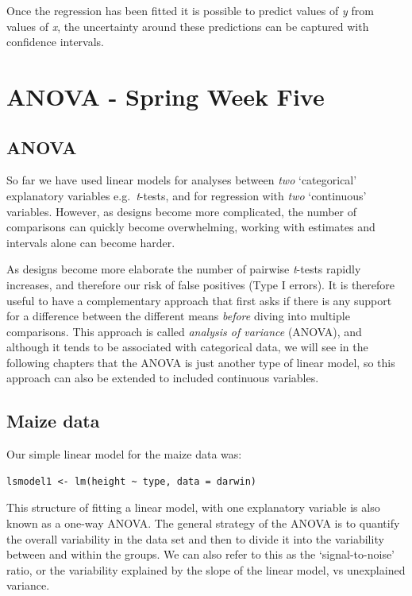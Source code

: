 \documentclass[
]{book}
\begin{document}
Once the regression has been fitted it is possible to predict values of \emph{y} from values of \emph{x}, the uncertainty around these predictions can be captured with confidence intervals.

\hypertarget{anova---spring-week-five}{%
\chapter{ANOVA - Spring Week Five}\label{anova---spring-week-five}}

\hypertarget{anova}{%
\section{ANOVA}\label{anova}}

So far we have used linear models for analyses between \emph{two} `categorical' explanatory variables e.g.~\emph{t}-tests, and for regression with \emph{two} `continuous' variables. However, as designs become more complicated, the number of comparisons can quickly become overwhelming, working with estimates and intervals alone can become harder.

As designs become more elaborate the number of pairwise \emph{t}-tests rapidly increases, and therefore our risk of false positives (Type I errors). It is therefore useful to have a complementary approach that first asks if there is any support for a difference between the different means \emph{before} diving into multiple comparisons. This approach is called \emph{analysis of variance} (ANOVA), and although it tends to be associated with categorical data, we will see in the following chapters that the ANOVA is just another type of linear model, so this approach can also be extended to included continuous variables.

\hypertarget{maize-data}{%
\section{Maize data}\label{maize-data}}

Our simple linear model for the maize data was:

\begin{verbatim}
lsmodel1 <- lm(height ~ type, data = darwin)
\end{verbatim}

This structure of fitting a linear model, with one explanatory variable is also known as a one-way ANOVA. The general strategy of the ANOVA is to quantify the overall variability in the data set and then to divide it into the variability between and within the groups. We can also refer to this as the `signal-to-noise' ratio, or the variability explained by the slope of the linear model, vs unexplained variance.
\end{document}
